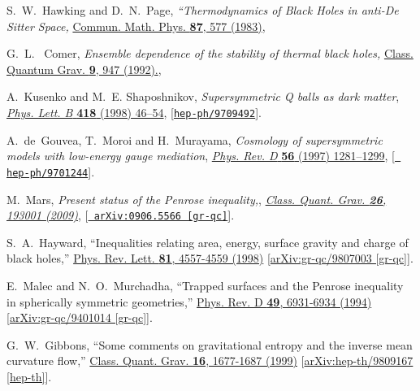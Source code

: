\documentclass[pr, twocolumn, preprintnumbers, showpacs,footnoteadded, superscriptaddress,nofootinbib,longbibliography]{revtex4-1}
\begin{document}
\begin{thebibliography}{99}
S.~W.~Hawking and D.~N.~Page,
\emph{``Thermodynamics of Black Holes in anti-De Sitter Space,}
\href{http://dx.doi.org/10.1007/BF01208266}{Commun. Math. Phys. \textbf{87}, 577 (1983)},


G.~L.~ Comer,
\emph{Ensemble dependence of the stability of thermal black holes,}
\href{http://dx.doi.org/10.1088/0264-9381/9/4/011}{Class. Quantum Grav. \textbf{9}, 947 (1992).},



A.~Kusenko and M.~E. Shaposhnikov, \emph{{Supersymmetric Q balls as dark
  matter}}, \href{http://dx.doi.org/10.1016/S0370-2693(97)01375-0}{\emph{Phys.
  Lett. B} {\bf 418} (1998) 46--54},
  [\href{http://arxiv.org/abs/hep-ph/9709492}{{\tt hep-ph/9709492}}].

A.~de~Gouvea, T.~Moroi and H.~Murayama, \emph{{Cosmology of supersymmetric
  models with low-energy gauge mediation}},
  \href{http://dx.doi.org/10.1103/PhysRevD.56.1281}{\emph{Phys. Rev. D} {\bf
  56} (1997) 1281--1299}, [\href{http://arxiv.org/abs/hep-ph/9701244}{{\tt
  hep-ph/9701244}}].

M.~Mars,
\emph{{Present status of the Penrose inequality,}},
\href{http://dx.doi.org/10.1088/0264-9381/26/19/193001}{\emph{Class. Quant. Grav. \textbf{26}, 193001 (2009)}},
 [\href{http://arxiv.org/abs/gr-qc/0906.5566}{{\tt
 arXiv:0906.5566 [gr-qc]}}].

S.~A.~Hayward,
``Inequalities relating area, energy, surface gravity and charge of black holes,''
\href{https://doi.org/10.1103/PhysRevLett.81.4557}{Phys. Rev. Lett. \textbf{81}, 4557-4559 (1998)}
[\href{https://arxiv.org/pdf/gr-qc/9807003.pdf}{arXiv:gr-qc/9807003 [gr-qc]}].

E.~Malec and N.~O.~Murchadha,
``Trapped surfaces and the Penrose inequality in spherically symmetric geometries,''
\href{https://doi.org/10.1103/PhysRevD.49.6931}{Phys. Rev. D \textbf{49}, 6931-6934 (1994)}
[\href{https://arxiv.org/pdf/gr-qc/9401014.pdf}{arXiv:gr-qc/9401014 [gr-qc]}].

G.~W.~Gibbons,
``Some comments on gravitational entropy and the inverse mean curvature flow,''
\href{https://doi.org/10.1088/0264-9381/16/6/302}{Class. Quant. Grav. \textbf{16}, 1677-1687 (1999)}
[\href{https://arxiv.org/pdf/hep-th/9809167.pdf}{arXiv:hep-th/9809167 [hep-th]}].


\end{thebibliography}
\end{document}
